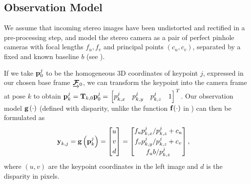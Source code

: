 \subsection{Observation Model}
We assume that incoming stereo images have been undistorted and rectified in a pre-processing step, and model the stereo camera as a pair of perfect pinhole cameras with focal lengths $f_u, f_v$ and principal points $\left(c_u,c_v\right)$, separated by a fixed and known baseline $b$ (see ).

If we take $\boldsymbol{\mathbf{p}}_0^j$ to be the homogeneous 3D coordinates of keypoint $j$, expressed in our chosen base frame $\underrightarrow{ \boldsymbol{\mathbf{\mathcal{F}}} }_{0}$, we can transform the keypoint into the camera frame at pose $k$ to obtain $\boldsymbol{\mathbf{p}}_k^j = \boldsymbol{\mathbf{T}}_{k,0}\boldsymbol{\mathbf{p}}_0^j = \left.{\begin{bmatrix} p_{k,x}^j & p_{k,y}^j & p_{k,z}^j & 1 \end{bmatrix}}\right.^T$. Our observation model $\boldsymbol{\mathbf{g}}\left(\cdot\right)$ (defined with disparity, unlike the function $\boldsymbol{\mathbf{f}}(\cdot)$ in ) can then be formulated as
\begin{align} \label{eq:cam_model}
    \Vector{y}_{k,j} &= \CameraModel{\Keypoint_k^j}
                    = \bbm u \\ v \T \\ d \T \ebm 
                    = \bbm 
			   		    f_u \KeypointComponent_{k,x}^j / \KeypointComponent_{k,z}^j + c_u \\
			   		    f_v \KeypointComponent_{k,y}^j / \KeypointComponent_{k,z}^j + c_v \T \\
			   		    f_u b / \KeypointComponent_{k,z}^j  \T
			         \ebm,
\end{align}
where $\left(u,v\right)$ are the keypoint coordinates in the left image and $d$ is the disparity in pixels.

